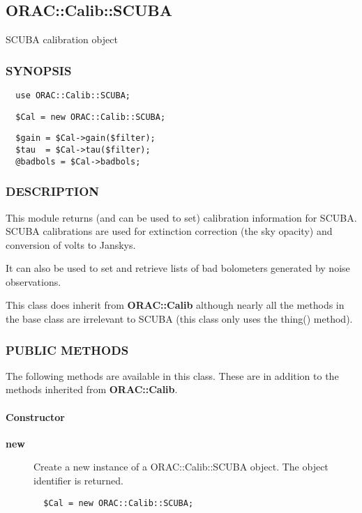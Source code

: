 \subsection{ORAC::Calib::SCUBA\label{ORAC::Calib::SCUBA}}

SCUBA calibration object

\subsubsection*{SYNOPSIS\label{ORAC::Calib::SCUBA_SYNOPSIS}}\begin{verbatim}
  use ORAC::Calib::SCUBA;
\end{verbatim}
\begin{verbatim}
  $Cal = new ORAC::Calib::SCUBA;
\end{verbatim}
\begin{verbatim}
  $gain = $Cal->gain($filter);
  $tau  = $Cal->tau($filter);
  @badbols = $Cal->badbols;
\end{verbatim}
\subsubsection*{DESCRIPTION\label{ORAC::Calib::SCUBA_DESCRIPTION}}

This module returns (and can be used to set) calibration information
for SCUBA. SCUBA calibrations are used for extinction correction
(the sky opacity) and conversion of volts to Janskys.



It can also be used to set and retrieve lists of bad bolometers generated
by noise observations.



This class does inherit from \textbf{ORAC::Calib} although nearly all the
methods in the base class are irrelevant to SCUBA (this class only
uses the thing() method).

\subsubsection*{PUBLIC METHODS\label{ORAC::Calib::SCUBA_PUBLIC_METHODS}}

The following methods are available in this class.
These are in addition to the methods inherited from \textbf{ORAC::Calib}.

\paragraph*{Constructor\label{ORAC::Calib::SCUBA_Constructor}}\begin{description}
\item[\textbf{new}] \mbox{}

Create a new instance of a ORAC::Calib::SCUBA object.
The object identifier is returned.

\begin{verbatim}
  $Cal = new ORAC::Calib::SCUBA;
\end{verbatim}
\end{description}
